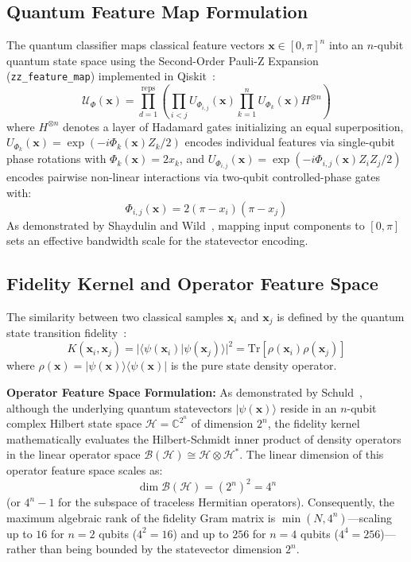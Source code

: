 \documentclass[12pt,a4paper]{article}
\begin{document}
\subsection{Quantum Feature Map Formulation}
The quantum classifier maps classical feature vectors $\mathbf{x} \in [0, \pi]^n$ into an $n$-qubit quantum state space using the Second-Order Pauli-Z Expansion (\texttt{zz\_feature\_map}) implemented in Qiskit~\cite{qiskit2026, suzuki2020analysis}:
\begin{equation}
\mathcal{U}_{\Phi}(\mathbf{x}) = \prod_{d=1}^{\text{reps}} \left( \prod_{i < j} U_{\Phi_{i,j}}(\mathbf{x}) \prod_{k=1}^n U_{\Phi_k}(\mathbf{x}) H^{\otimes n} \right)
\end{equation}
where $H^{\otimes n}$ denotes a layer of Hadamard gates initializing an equal superposition, $U_{\Phi_k}(\mathbf{x}) = \exp(-i \Phi_k(\mathbf{x}) Z_k / 2)$ encodes individual features via single-qubit phase rotations with $\Phi_k(\mathbf{x}) = 2 x_k$, and $U_{\Phi_{i,j}}(\mathbf{x}) = \exp(-i \Phi_{i,j}(\mathbf{x}) Z_i Z_j / 2)$ encodes pairwise non-linear interactions via two-qubit controlled-phase gates with:
\begin{equation}
\Phi_{i,j}(\mathbf{x}) = 2(\pi - x_i)(\pi - x_j)
\end{equation}
As demonstrated by Shaydulin and Wild~\cite{shaydulin2022importance}, mapping input components to $[0, \pi]$ sets an effective bandwidth scale for the statevector encoding.

\subsection{Fidelity Kernel and Operator Feature Space}
The similarity between two classical samples $\mathbf{x}_i$ and $\mathbf{x}_j$ is defined by the quantum state transition fidelity~\cite{havlicek2019supervised, schuld2019quantum}:
\begin{equation}
K(\mathbf{x}_i, \mathbf{x}_j) = |\langle \psi(\mathbf{x}_i) | \psi(\mathbf{x}_j) \rangle|^2 = \text{Tr}\left[ \rho(\mathbf{x}_i) \rho(\mathbf{x}_j) \right]
\end{equation}
where $\rho(\mathbf{x}) = |\psi(\mathbf{x})\rangle\langle\psi(\mathbf{x})|$ is the pure state density operator.

\noindent\textbf{Operator Feature Space Formulation:} As demonstrated by Schuld~\cite{schuld2021supervised}, although the underlying quantum statevectors $|\psi(\mathbf{x})\rangle$ reside in an $n$-qubit complex Hilbert state space $\mathcal{H} = \mathbb{C}^{2^n}$ of dimension $2^n$, the fidelity kernel mathematically evaluates the Hilbert-Schmidt inner product of density operators in the linear operator space $\mathcal{B}(\mathcal{H}) \cong \mathcal{H} \otimes \mathcal{H}^*$. The linear dimension of this operator feature space scales as:
\begin{equation}
\dim \mathcal{B}(\mathcal{H}) = (2^n)^2 = 4^n
\end{equation}
(or $4^n - 1$ for the subspace of traceless Hermitian operators). Consequently, the maximum algebraic rank of the fidelity Gram matrix is $\min(N, 4^n)$---scaling up to $16$ for $n=2$ qubits ($4^2 = 16$) and up to $256$ for $n=4$ qubits ($4^4 = 256$)---rather than being bounded by the statevector dimension $2^n$.
\end{document}
